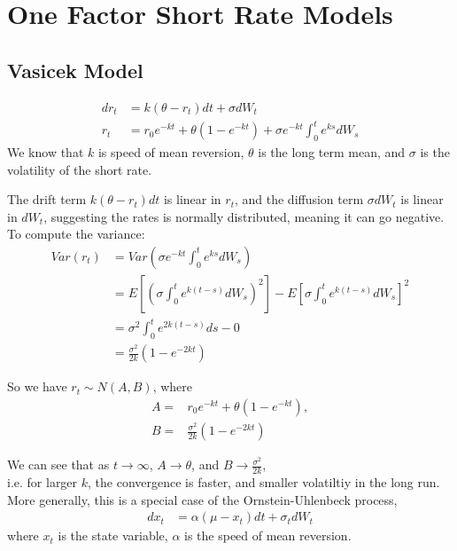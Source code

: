 \section{One Factor Short Rate Models}
\subsection{Vasicek Model}
\begin{align*}
dr_t &= k(\theta-r_t)dt + \sigma dW_t\\
r_t &= r_0 e^{-kt} + \theta(1-e^{-kt}) + \sigma e^{-kt} \int_0^t e^{ks} dW_s
\end{align*}
We know that $k$ is speed of mean reversion, 
$\theta$ is the long term mean, and $\sigma$ is the volatility of the short rate.

The drift term $k(\theta-r_t)dt$ is linear in $r_t$, 
and the diffusion term $\sigma dW_t$ is linear in $dW_t$, suggesting 
the rates is normally distributed, meaning it can go negative.\\
To compute the variance:
\begin{align*}
Var(r_t) &= Var\left(\sigma e^{-kt} \int_0^t e^{ks} dW_s\right)\\
&= E\left[\left(\sigma \int_0^t e^{k(t-s)} dW_s\right)^2\right] 
- E\left[\sigma \int_0^t e^{k(t-s)} dW_s\right]^2\\
&= \sigma^2 \int_0^t e^{2k(t-s)} ds - 0\\
&= \frac{\sigma^2}{2k}(1-e^{-2kt})
\end{align*}

So we have $ r_t \sim N\left(A, B\right)$, where
\begin{align*}
    A =& r_0 e^{-kt} + \theta(1-e^{-kt}), \\
    B =& \frac{\sigma^2}{2k}(1-e^{-2kt})
\end{align*}

We can see that as $ t \to \infty$, $ A \to \theta$, 
and $ B \to \frac{\sigma^2}{2k}$,\\
i.e. for larger $k$, the convergence is faster,
and smaller volatiltiy in the long run.\\

More generally, this is a special case of the Ornstein-Uhlenbeck process,
\begin{align*}
dx_t &= \alpha(\mu-x_t)dt + \sigma_t dW_t
\end{align*}
where $x_t$ is the state variable, $\alpha$ is the speed of mean reversion.\\

